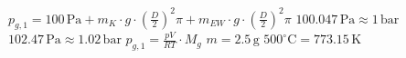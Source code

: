 \( p_{g,1} = 100 \, \text{Pa} + m_K \cdot g \cdot \left(\frac{D}{2}\right)^2 \pi + m_{EW} \cdot g \cdot \left(\frac{D}{2}\right)^2 \pi \)  
\( 100.047 \, \text{Pa} \approx 1 \, \text{bar} \)  
\( 102.47 \, \text{Pa} \approx 1.02 \, \text{bar} \)  
\( p_{g,1} = \frac{pV}{RT} \cdot M_g \)  
\( m = 2.5 \, \text{g} \)  
\( 500^\circ \text{C} = 773.15 \, \text{K} \)